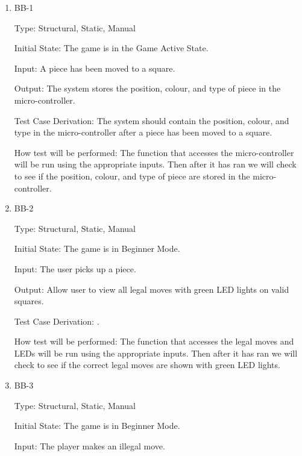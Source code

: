 \documentclass[12pt, titlepage]{article}
\begin{document}
  \begin{enumerate}

    \item{BB-1\\}

    Type: Structural, Static, Manual
                        
    Initial State: The game is in the Game Active State.
                        
    Input: A piece has been moved to a square.
                        
    Output: The system stores the position, colour, and type of piece in the micro-controller.
                        
    Test Case Derivation: The system should contain the position, colour, and type in the micro-controller
    after a piece has been moved to a square.

    How test will be performed: The function that accesses the micro-controller will be run using the appropriate inputs.
    Then after it has ran we will check to see if the position, colour, and type of piece are stored in the micro-controller.  

    \item{BB-2\\}

    Type: Structural, Static, Manual
                        
    Initial State: The game is in Beginner Mode.
                        
    Input: The user picks up a piece.
                        
    Output: Allow user to view all legal moves with green LED
    lights on valid squares.
                        
    Test Case Derivation: .

    How test will be performed: The function that accesses the legal moves and LEDs will be run using the appropriate inputs.
    Then after it has ran we will check to see if the correct legal moves are shown with green LED lights.  

    \item{BB-3\\}

    Type: Structural, Static, Manual
                        
    Initial State: The game is in Beginner Mode.
                        
    Input: The player makes an illegal move.
                        

\end{enumerate}
\end{document}
